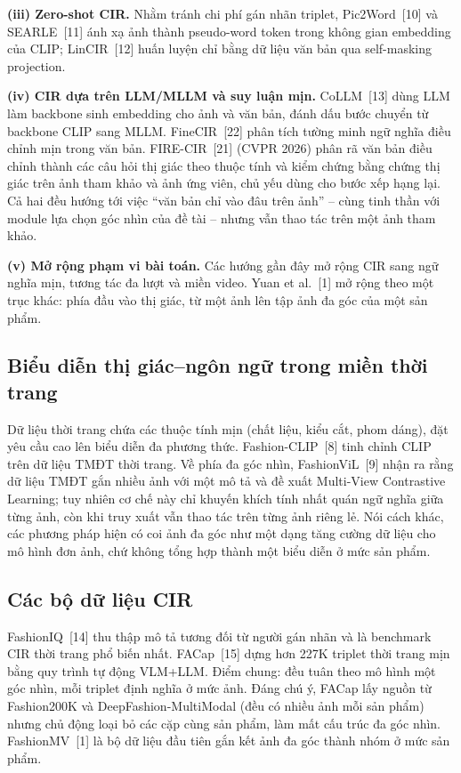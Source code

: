 \documentclass[a4paper]{article}
\begin{document}
\textbf{(iii) Zero-shot CIR.} Nhằm tránh chi phí gán nhãn triplet, Pic2Word~[10] và SEARLE~[11] ánh xạ ảnh thành pseudo-word token trong không gian embedding của CLIP; LinCIR~[12] huấn luyện chỉ bằng dữ liệu văn bản qua self-masking projection.

\textbf{(iv) CIR dựa trên LLM/MLLM và suy luận mịn.} CoLLM~[13] dùng LLM làm backbone sinh embedding cho ảnh và văn bản, đánh dấu bước chuyển từ backbone CLIP sang MLLM. FineCIR~[22] phân tích tường minh ngữ nghĩa điều chỉnh mịn trong văn bản. FIRE-CIR~[21] (CVPR 2026) phân rã văn bản điều chỉnh thành các câu hỏi thị giác theo thuộc tính và kiểm chứng bằng chứng thị giác trên ảnh tham khảo và ảnh ứng viên, chủ yếu dùng cho bước xếp hạng lại. Cả hai đều hướng tới việc ``văn bản chỉ vào đâu trên ảnh'' -- cùng tinh thần với module lựa chọn góc nhìn của đề tài -- nhưng vẫn thao tác trên một ảnh tham khảo.

\textbf{(v) Mở rộng phạm vi bài toán.} Các hướng gần đây mở rộng CIR sang ngữ nghĩa mịn, tương tác đa lượt và miền video. Yuan et al.~[1] mở rộng theo một trục khác: phía đầu vào thị giác, từ một ảnh lên tập ảnh đa góc của một sản phẩm.

\subsection{Biểu diễn thị giác--ngôn ngữ trong miền thời trang}
Dữ liệu thời trang chứa các thuộc tính mịn (chất liệu, kiểu cắt, phom dáng), đặt yêu cầu cao lên biểu diễn đa phương thức. Fashion-CLIP~[8] tinh chỉnh CLIP trên dữ liệu TMĐT thời trang. Về phía đa góc nhìn, FashionViL~[9] nhận ra rằng dữ liệu TMĐT gắn nhiều ảnh với một mô tả và đề xuất Multi-View Contrastive Learning; tuy nhiên cơ chế này chỉ khuyến khích tính nhất quán ngữ nghĩa giữa từng ảnh, còn khi truy xuất vẫn thao tác trên từng ảnh riêng lẻ. Nói cách khác, các phương pháp hiện có coi ảnh đa góc như một dạng tăng cường dữ liệu cho mô hình đơn ảnh, chứ không tổng hợp thành một biểu diễn ở mức sản phẩm.

\subsection{Các bộ dữ liệu CIR}
FashionIQ~[14] thu thập mô tả tương đối từ người gán nhãn và là benchmark CIR thời trang phổ biến nhất. FACap~[15] dựng hơn 227K triplet thời trang mịn bằng quy trình tự động VLM+LLM. Điểm chung: đều tuân theo mô hình một góc nhìn, mỗi triplet định nghĩa ở mức ảnh. Đáng chú ý, FACap lấy nguồn từ Fashion200K và DeepFashion-MultiModal (đều có nhiều ảnh mỗi sản phẩm) nhưng chủ động loại bỏ các cặp cùng sản phẩm, làm mất cấu trúc đa góc nhìn. FashionMV~[1] là bộ dữ liệu đầu tiên gắn kết ảnh đa góc thành nhóm ở mức sản phẩm.
\end{document}
